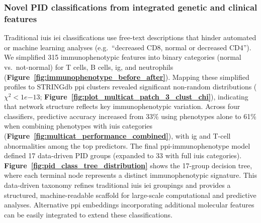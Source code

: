 \subsubsection*{Novel PID classifications from integrated genetic and clinical features}
Traditional \ac{iuis} \ac{iei} classifications use free-text descriptions that hinder automated or machine learning analyses (e.g.\ ``decreased CD8, normal or decreased CD4''). 
We simplified 315 immunophenotypic features into binary categories (normal vs.\ not-normal) for T cells, B cells, \ac{ig}, and neutrophils (\textbf{Figure~\ref{fig:immunophenotype_before_after}}). 
Mapping these simplified profiles to STRINGdb \ac{ppi} clusters revealed significant non-random distributions ($\chi^2 < 1e{-13}$; \textbf{Figure~\ref{fig:plot_multicat_patch_3_clust_chi}}), indicating that network structure reflects key immunophenotypic variation. 
Across four classifiers, predictive accuracy increased from 33\% using phenotypes alone to 61\% when combining phenotypes with \ac{iuis} categories (\textbf{Figure~\ref{fig:multicat_performance_combined}}), with \ac{ig} and T-cell abnormalities among the top predictors. 
The final \ac{ppi}-immunophenotype model defined 17 data-driven PID groups (expanded to 33 with full \ac{iuis} categories). 
\textbf{Figure~\ref{fig:pid_class_tree_distribution}} shows the 17-group decision tree, where each terminal node represents a distinct immunophenotypic signature. 
This data-driven taxonomy refines traditional \ac{iuis} \ac{iei} groupings and provides a structured, machine-readable scaffold for large-scale computational and predictive analyses. Alternative \ac{ppi} embeddings incorporating additional molecular features can be easily integrated to extend these classifications.

